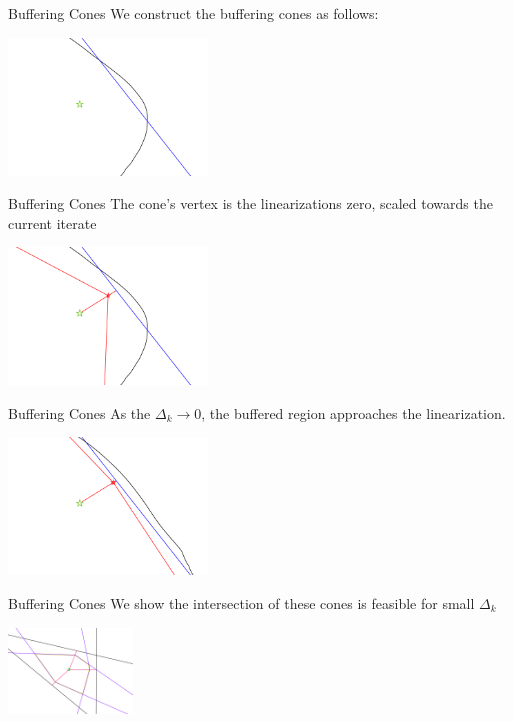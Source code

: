 \documentclass{beamer}
\newcommand{\dk}{{\Delta_k}}
\begin{document}
\begin{frame}{Buffering Cones}
	We construct the buffering cones as follows:
	\begin{center}
		\includegraphics[width=200px]{images/explanation_1.png}
	\end{center}
\end{frame}


\begin{frame}{Buffering Cones}
	The cone's vertex is the linearizations zero, scaled towards the current iterate
	\begin{center}
		\includegraphics[width=200px]{images/explanation_2.png}
	\end{center}
\end{frame}


\begin{frame}{Buffering Cones}
	As the $\dk \to 0$, the buffered region approaches the linearization.
	\begin{center}
		\includegraphics[width=200px]{images/explanation_3.png}
	\end{center}
\end{frame}


\begin{frame}{Buffering Cones}
	We show the intersection of these cones is feasible for small $\Delta_k$
 	\begin{center}
 		\includegraphics[width=125px]{images/completed_1.png}
 	\end{center}
\end{frame}
\end{document}
